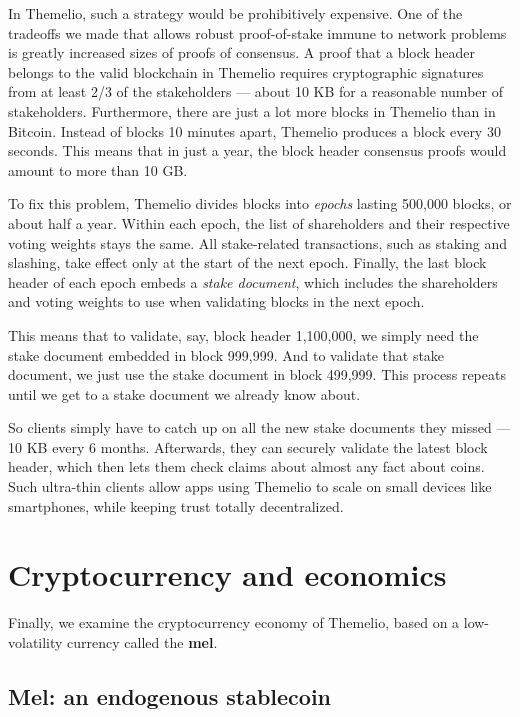 \documentclass[headinclude,12pt]{scrbook}
\begin{document}
In Themelio, such a strategy would be prohibitively expensive. One of the tradeoffs we made that allows robust proof-of-stake immune to network problems is greatly increased sizes of proofs of consensus. A proof that a block header belongs to the valid blockchain in Themelio requires cryptographic signatures from at least 2/3 of the stakeholders --- about 10 KB for a reasonable number of stakeholders. Furthermore, there are just a lot more blocks in Themelio than in Bitcoin. Instead of blocks 10 minutes apart, Themelio produces a block every 30 seconds. This means that in just a year, the block header consensus proofs would amount to more than 10 GB.

To fix this problem, Themelio divides blocks into \textit{epochs} lasting 500,000 blocks, or about half a year. Within each epoch, the list of shareholders and their respective voting weights stays the same. All stake-related transactions, such as staking and slashing, take effect only at the start of the next epoch. Finally, the last block header of each epoch embeds a \textit{stake document}, which includes the shareholders and voting weights to use when validating blocks in the next epoch.

This means that to validate, say, block header 1,100,000, we simply need the stake document embedded in block 999,999. And to validate that stake document, we just use the stake document in block 499,999. This process repeats until we get to a stake document we already know about.

So clients simply have to catch up on all the new stake documents they missed --- 10 KB every 6 months. Afterwards, they can securely validate the latest block header, which then lets them check claims about almost any fact about coins. Such ultra-thin clients allow apps using Themelio to scale on small devices like smartphones, while keeping trust totally decentralized.

\section{Cryptocurrency and economics}

Finally, we examine the cryptocurrency economy of Themelio, based on a low-volatility currency called the \textbf{mel}.

\subsection{Mel: an endogenous stablecoin} \label{ss:elasticoin}
\end{document}
